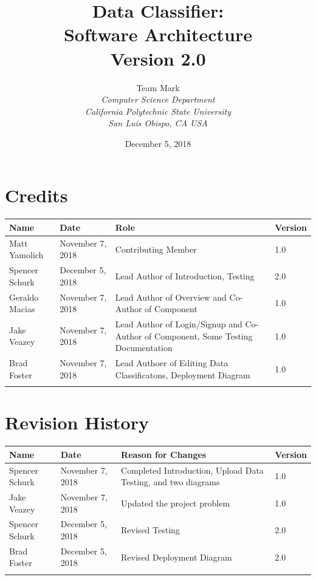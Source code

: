 \documentclass[12pt,oneside,letterpaper]{article}
\begin{document}
\title{\bfseries Data Classifier: \\
Software Architecture\\
Version 2.0}

\author {
\large{Team Mark}\\
\emph{Computer Science Department}\\
\emph{California Polytechnic State University}\\
\emph{San Luis Obispo, CA USA}\\
}

\date{December 5, 2018}
\maketitle \thispagestyle{empty}

\pagebreak
\tableofcontents



\section*{Credits}
\begin{tabular}{|l|l|p{2.5in}|l|}
\hline
\textbf{Name}&\textbf{Date}&\textbf{Role}&\textbf{Version}\\
\hline
Matt Yamolich &November 7, 2018&Contributing Member&1.0\\
\hline
Spencer Schurk&December 5, 2018&Lead Author of Introduction, Testing&2.0\\
\hline
Geraldo Macias&November 7, 2018&Lead Author of Overview and Co-Author of Component&1.0\\
\hline
Jake Veazey&November 7, 2018&Lead Author of Login/Signup and Co-Author of Component, Some Testing Documentation&1.0\\
\hline
Brad Foster&November 7, 2018&Lead Authoer of Editing Data Classificatons, Deployment Diagram&1.0\\
\hline
&&&\\
\hline
\end{tabular}

\section*{Revision History}
\begin{tabular}{|l|l|p{2.5in}|l|}
\hline
\textbf{Name}&\textbf{Date}&\textbf{Reason for Changes}&\textbf{Version}\\
\hline
Spencer Schurk&November 7, 2018&Completed Introduction, Upload Data Testing, and two diagrams&1.0\\
\hline
Jake Veazey&November 7, 2018&Updated the project problem&1.0\\
\hline
Spencer Schurk&December 5, 2018&Revised Testing&2.0\\
\hline
Brad Foster&December 5, 2018&Revised Deployment Diagram&2.0\\
\hline
&&&\\
\hline
\end{tabular}
\end{document}
